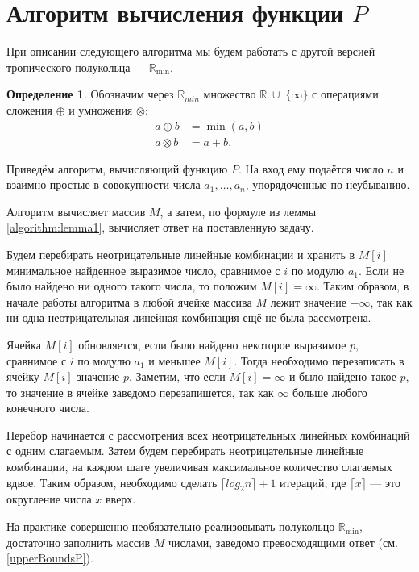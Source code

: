 \documentclass[12pt]{article}
\theoremstyle{definition}
\newtheorem{definition}[theorem]{Определение}
\begin{document}
\section{Алгоритм вычисления функции $P$}
\label{algorithmSection}

При описании следующего алгоритма мы будем работать с другой версией тропического полукольца --- $\mathbb{R}_{\min}$.

\begin{definition}
Обозначим через $\mathbb{R}_{min}$ множество $\mathbb{R} \; \cup \; \{ \infty\}$ с операциями сложения $\oplus$ и умножения $\otimes$:
\begin{align*}
            a \oplus b &= \min(a, b)\\
            a \otimes b &= a + b.
        \end{align*}
\end{definition}

Приведём алгоритм, вычисляющий функцию $P$. На вход ему подаётся  число $n$ и взаимно простые в совокупности числа $a_1, \dots, a_n$, упорядоченные по неубыванию.

Алгоритм вычисляет массив $M$, а затем, по формуле из леммы \ref{algorithm:lemma1}, вычисляет ответ на поставленную задачу. 

Будем перебирать неотрицательные линейные комбинации и хранить в $M[i]$ минимальное найденное выразимое число, сравнимое с $i$ по модулю $a_1$. Если не было найдено ни одного такого числа, то положим $M[i] = \infty$. Таким образом, в начале работы алгоритма в любой ячейке массива $M$ лежит значение $-\infty$, так как ни одна неотрицательная линейная комбинация ещё не была рассмотрена.

Ячейка $M[i]$ обновляется, если было найдено некоторое выразимое $p$, сравнимое с $i$ по модулю $a_1$ и меньшее $M[i]$. Тогда необходимо перезаписать в ячейку $M[i]$ значение $p$. Заметим, что если $M[i] = \infty$ и было найдено такое $p$, то значение в ячейке заведомо перезапишется, так как $\infty$ больше любого конечного числа.

Перебор начинается с рассмотрения всех неотрицательных линейных комбинаций с одним слагаемым. Затем будем перебирать неотрицательные линейные комбинации, на каждом шаге увеличивая максимальное количество слагаемых вдвое. Таким образом, необходимо сделать $\lceil log_2n \rceil + 1$ итераций, где $\lceil x \rceil$ --- это округление числа $x$ вверх.

На практике совершенно необязательно реализовывать полукольцо $\mathbb{R}_{\min}$, достаточно заполнить массив $M$ числами, заведомо превосходящими ответ (см. \ref{upperBoundsP}).
\end{document}

